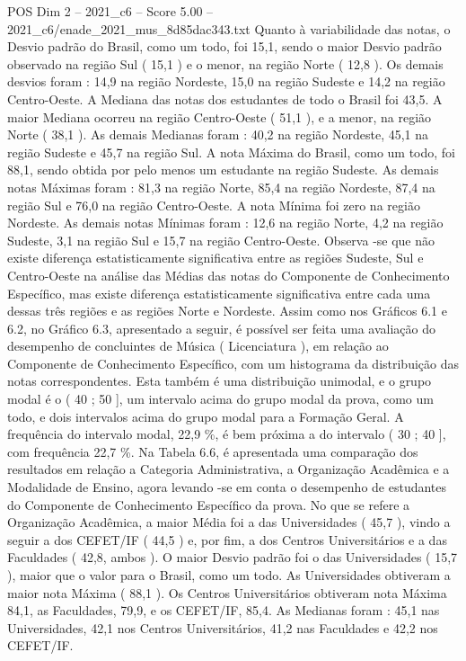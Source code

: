 \begin{textsample}{POS Dim 2 – 2021\_c6 – Score 5.00 – 2021\_c6/enade\_2021\_mus\_8d85dac343.txt}
Quanto à variabilidade das notas, o Desvio padrão do Brasil, como um todo, foi 15,1, sendo o maior Desvio padrão observado na região Sul ( 15,1 ) e o menor, na região Norte ( 12,8 ).
Os demais desvios foram : 14,9 na região Nordeste, 15,0 na região Sudeste e 14,2 na região Centro-Oeste.
A Mediana das notas dos estudantes de todo o Brasil foi 43,5.
A maior Mediana ocorreu na região Centro-Oeste ( 51,1 ), e a menor, na região Norte ( 38,1 ).
As demais Medianas foram : 40,2 na região Nordeste, 45,1 na região Sudeste e 45,7 na região Sul.
A nota Máxima do Brasil, como um todo, foi 88,1, sendo obtida por pelo menos um estudante na região Sudeste.
As demais notas Máximas foram : 81,3 na região Norte, 85,4 na região Nordeste, 87,4 na região Sul e 76,0 na região Centro-Oeste.
A nota Mínima foi zero na região Nordeste.
As demais notas Mínimas foram : 12,6 na região Norte, 4,2 na região Sudeste, 3,1 na região Sul e 15,7 na região Centro-Oeste.
Observa -se que não existe diferença estatisticamente significativa entre as regiões Sudeste, Sul e Centro-Oeste na análise das Médias das notas do Componente de Conhecimento Específico, mas existe diferença estatisticamente significativa entre cada uma dessas três regiões e as regiões Norte e Nordeste.
Assim como nos Gráficos 6.1 e 6.2, no Gráfico 6.3, apresentado a seguir, é possível ser feita uma avaliação do desempenho de concluintes de Música ( Licenciatura ), em relação ao Componente de Conhecimento Específico, com um histograma da distribuição das notas correspondentes.
Esta também é uma distribuição unimodal, e o grupo modal é o ( 40 ; 50 ], um intervalo acima do grupo modal da prova, como um todo, e dois intervalos acima do grupo modal para a Formação Geral.
A frequência do intervalo modal, 22,9 \%, é bem próxima a do intervalo ( 30 ; 40 ], com frequência 22,7 \%.
Na Tabela 6.6, é apresentada uma comparação dos resultados em relação a Categoria Administrativa, a Organização Acadêmica e a Modalidade de Ensino, agora levando -se em conta o desempenho de estudantes do Componente de Conhecimento Específico da prova.
No que se refere a Organização Acadêmica, a maior Média foi a das Universidades ( 45,7 ), vindo a seguir a dos CEFET/IF ( 44,5 ) e, por fim, a dos Centros Universitários e a das Faculdades ( 42,8, ambos ).
O maior Desvio padrão foi o das Universidades ( 15,7 ), maior que o valor para o Brasil, como um todo.
As Universidades obtiveram a maior nota Máxima ( 88,1 ).
Os Centros Universitários obtiveram nota Máxima 84,1, as Faculdades, 79,9, e os CEFET/IF, 85,4.
As Medianas foram : 45,1 nas Universidades, 42,1 nos Centros Universitários, 41,2 nas Faculdades e 42,2 nos CEFET/IF.

\end{textsample}
